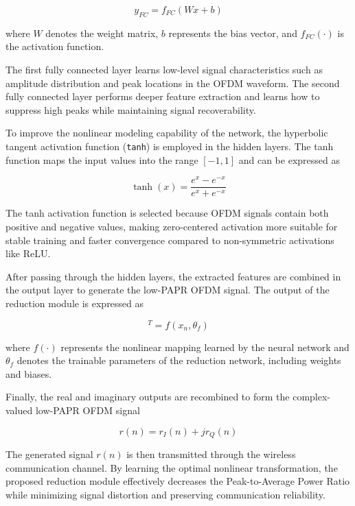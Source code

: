 \begin{equation*}
    y_{FC}=f_{FC}(Wx+b)
\end{equation*}

where $W$ denotes the weight matrix, $b$ represents the bias vector, and $f_{FC}(\cdot)$ is the activation function.

The first fully connected layer learns low-level signal characteristics such as amplitude distribution and peak locations in the OFDM waveform. The second fully connected layer performs deeper feature extraction and learns how to suppress high peaks while maintaining signal recoverability.

To improve the nonlinear modeling capability of the network, the hyperbolic tangent activation function (\texttt{tanh}) is employed in the hidden layers. The tanh function maps the input values into the range $[-1,1]$ and can be expressed as

\begin{equation*}
    \tanh(x)=\frac{e^x-e^{-x}}{e^x+e^{-x}}
\end{equation*}

The tanh activation function is selected because OFDM signals contain both positive and negative values, making zero-centered activation more suitable for stable training and faster convergence compared to non-symmetric activations like ReLU.

After passing through the hidden layers, the extracted features are combined in the output layer to generate the low-PAPR OFDM signal. The output of the reduction module is expressed as

\begin{equation*}
    [r_I(n),r_Q(n)]^T=f(x_n,\theta_f)
\end{equation*}

where $f(\cdot)$ represents the nonlinear mapping learned by the neural network and $\theta_f$ denotes the trainable parameters of the reduction network, including weights and biases.

Finally, the real and imaginary outputs are recombined to form the complex-valued low-PAPR OFDM signal

\begin{equation*}
    r(n)=r_I(n)+j r_Q(n)
\end{equation*}

The generated signal $r(n)$ is then transmitted through the wireless communication channel. By learning the optimal nonlinear transformation, the proposed reduction module effectively decreases the Peak-to-Average Power Ratio while minimizing signal distortion and preserving communication reliability.

